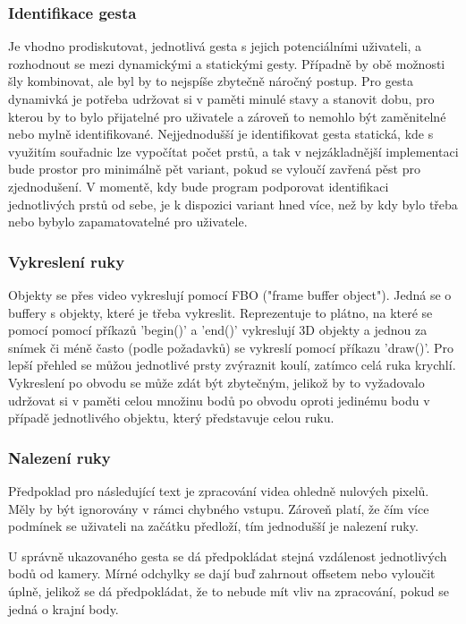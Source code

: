 \subsubsection{Identifikace gesta}
Je vhodno prodiskutovat, jednotlivá gesta s jejich potenciálními uživateli, a rozhodnout se mezi dynamickými a statickými gesty. Případně by obě možnosti šly kombinovat, ale byl by to nejspíše zbytečně náročný postup. Pro gesta dynamivká je potřeba udržovat si v paměti minulé stavy a stanovit dobu, pro kterou by to bylo přijatelné pro uživatele a zároveň to nemohlo být zaměnitelné nebo mylně identifikované. Nejjednodušší je identifikovat gesta statická, kde s využitím souřadnic lze vypočítat počet prstů, a tak v nejzákladnější implementaci bude prostor pro minimálně pět variant, pokud se vyloučí zavřená pěst pro zjednodušení. V momentě, kdy bude program podporovat identifikaci jednotlivých prstů od sebe, je k dispozici variant hned více, než by kdy bylo třeba nebo bybylo zapamatovatelné pro uživatele.

\subsubsection{Vykreslení ruky}
Objekty se přes video vykreslují pomocí FBO ("frame buffer object"). Jedná se o buffery s objekty, které je třeba vykreslit. Reprezentuje to plátno, na které se pomocí pomocí příkazů 'begin()' a 'end()' vykreslují 3D objekty a jednou za snímek či méně často (podle požadavků) se vykreslí pomocí příkazu 'draw()'. Pro lepší přehled se můžou jednotlivé prsty zvýraznit koulí, zatímco celá ruka krychlí. Vykreslení po obvodu se může zdát být zbytečným, jelikož by to vyžadovalo udržovat si v paměti celou množinu bodů po obvodu oproti jedinému bodu v případě jednotlivého objektu, který představuje celou ruku. 

\subsubsection{Nalezení ruky}
Předpoklad pro následující text je zpracování videa ohledně nulových pixelů. Měly by být ignorovány v rámci chybného vstupu. Zároveň platí, že čím více podmínek se uživateli na začátku předloží, tím jednodušší je nalezení ruky. 

U správně ukazovaného gesta se dá předpokládat stejná vzdálenost jednotlivých bodů od kamery. Mírné odchylky se dají buď zahrnout offsetem nebo vyloučit úplně, jelikož se dá předpokládat, že to nebude mít vliv na zpracování, pokud se jedná o krajní body.


